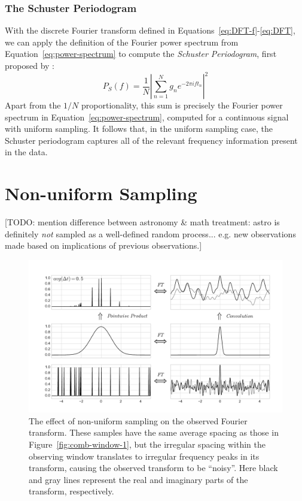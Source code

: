\documentclass[preprint]{aastex}
\newcommand{\todo}[1]{{\color{red} [TODO: #1]}}
\newcommand{\fig}[1]{Figure~\ref{fig:#1}}
\newcommand{\figlabel}[1]{\label{fig:#1}}
\newcommand{\Eq}[1]{Equation~\ref{eq:#1}}
\newcommand{\eq}[1]{\Eq{#1}}
\newcommand{\eqs}[2]{Equations~\ref{eq:#1}-\ref{eq:#2}}
\newcommand{\eqlabel}[1]{\label{eq:#1}}
\newcommand{\sectlabel}[1]{\label{sect:#1}}
\begin{document}
\subsubsection{The Schuster Periodogram}

With the discrete Fourier transform defined in \eqs{DFT-f}{DFT}, we can
apply the definition of the Fourier power spectrum from \eq{power-spectrum}
to compute the {\it Schuster Periodogram}, first proposed by \citet{Schuster98}:
\begin{equation}
  P_S(f) = \frac{1}{N}\left|\sum_{n=1}^N g_n e^{-2\pi i f t_n}\right|^2
  \eqlabel{schuster-periodogram}
\end{equation}
Apart from the $1/N$ proportionality, this sum is precisely the Fourier power
spectrum in \eq{power-spectrum}, computed for a continuous signal with
uniform sampling.
It follows that, in the uniform sampling case, the Schuster periodogram captures
all of the relevant frequency information present in the data.


\section{Non-uniform Sampling}
\sectlabel{non-uniform-sampling}

\todo{mention difference between astronomy \& math treatment: astro is definitely {\it not} sampled as a well-defined random process... e.g. new observations made based on implications of previous observations.}


\begin{figure}[ht]
  \centering
  \includegraphics[width=\textwidth]{fig10_random_window}
  \caption{The effect of non-uniform sampling on the observed Fourier transform.
    These samples have the same average spacing as those in \fig{comb-window-1},
    but the irregular spacing within the observing window translates to 
    irregular frequency peaks in its transform,
    causing the observed transform to be ``noisy''.
    Here black and gray lines represent the real and imaginary parts of the
    transform, respectively.
    \figlabel{random-window}}
\end{figure}
\end{document}
